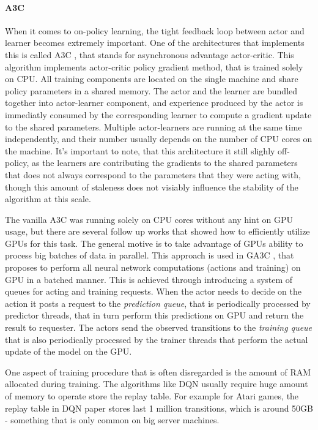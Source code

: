 \paragraph{A3C}
When it comes to on-policy learning, the tight feedback loop between actor and learner becomes
extremely important. One of the architectures that implements this is called A3C
\cite{mnih2016asynchronous}, that
stands for asynchronous advantage actor-critic. This algorithm implements actor-critic policy
gradient method, that is trained solely on CPU. All training components are located on the
single machine and share policy parameters in a shared memory. The actor and the learner are
bundled together into actor-learner component, and experience produced by the actor is immediatly
consumed by the corresponding learner to compute a gradient update to the shared parameters.
Multiple actor-learners are running at the same time independently, and their number usually
depends on the number of CPU cores on the machine. It's important to note, that this architecture
it still slighly off-policy, as the learners are contributing the gradients to the shared parameters
that does not always correspond to the parameters that they were acting with, though this amount
of staleness does not visiably influence the stability of the algorithm at this scale.

The vanilla A3C was running solely on CPU cores without any hint on GPU usage, but there are
several follow up works that showed how to efficiently utilize GPUs for this task. The general
motive is to take advantage of GPUs ability to process big batches of data in parallel.
This approach is used in GA3C \cite{babaeizadeh2016ga3c}, that proposes to perform all neural network computations
(actions and training) on GPU in a batched manner. This is achieved through introducing a system
of queues for acting and training requests. When the actor needs to decide on the action it
posts a request to the \emph{prediction queue}, that is periodically processed by predictor threads,
that in turn perform this predictions on GPU and return the result to requester.
The actors send the observed transitions to the \emph{training queue} that is also periodically
processed by the trainer threads that perform the actual update of the model on the GPU.

One aspect of training procedure that is often disregarded is the amount of RAM allocated during
training. The algorithms like DQN usually require huge amount of memory to operate store the
replay table. For example for Atari games, the replay table in DQN \cite{mnih-dqn-2015} paper stores
last 1 million transitions, which is around 50GB - something that is only common on big server
machines.


